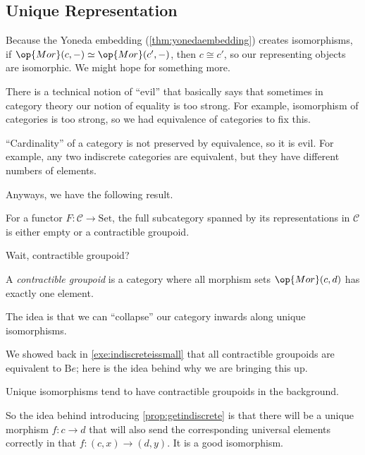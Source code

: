 \documentclass[../notes.tex]{subfiles}
\begin{document}
\subsection{Unique Representation}
Because the Yoneda embedding (\autoref{thm:yonedaembedding}) creates isomorphisms, if $\op{Mor}(c,-)\simeq\op{Mor}(c',-)$, then $c\cong c'$, so our representing objects are isomorphic. We might hope for something more.
\begin{remark}
	There is a technical notion of ``evil'' that basically says that sometimes in category theory our notion of equality is too strong. For example, isomorphism of categories is too strong, so we had equivalence of categories to fix this.
\end{remark}
\begin{example}
	``Cardinality'' of a category is not preserved by equivalence, so it is evil. For example, any two indiscrete categories are equivalent, but they have different numbers of elements.
\end{example}
Anyways, we have the following result.
\begin{proposition} \label{prop:getindiscrete}
	For a functor $F:\mathcal C\to\mathrm{Set}$, the full subcategory spanned by its representations in $\mathcal C$ is either empty or a contractible groupoid.
\end{proposition}
Wait, contractible groupoid?
\begin{definition}
	A \textit{contractible groupoid} is a category where all morphism sets $\op{Mor}(c,d)$ has exactly one element.
\end{definition}
\begin{remark}
	The idea is that we can ``collapse'' our category inwards along unique isomorphisms.
\end{remark}
We showed back in \autoref{exe:indiscreteissmall} that all contractible groupoids are equivalent to $\mathrm Be$; here is the idea behind why we are bringing this up.
\begin{idea}
	Unique isomorphisms tend to have contractible groupoids in the background.
\end{idea}
So the idea behind introducing \autoref{prop:getindiscrete} is that there will be a unique morphism $f:c\to d$ that will also send the corresponding universal elements correctly in that $f:(c,x)\to(d,y)$. It is a good isomorphism.
\end{document}
